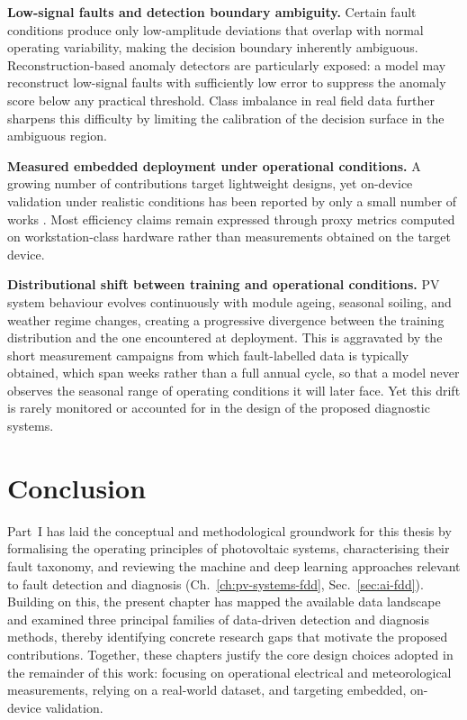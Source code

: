 \textbf{Low-signal faults and detection boundary ambiguity.} Certain fault conditions produce only low-amplitude deviations that overlap with normal operating variability, making the decision boundary inherently ambiguous. Reconstruction-based anomaly detectors are particularly exposed: a model may reconstruct low-signal faults with sufficiently low error to suppress the anomaly score below any practical threshold. Class imbalance in real field data further sharpens this difficulty by limiting the calibration of the decision surface in the ambiguous region.

\textbf{Measured embedded deployment under operational conditions.} A growing number of contributions target lightweight designs, yet on-device validation under realistic conditions has been reported by only a small number of works \citep{costa2020sensors}. Most efficiency claims remain expressed through proxy metrics computed on workstation-class hardware rather than measurements obtained on the target device.

\textbf{Distributional shift between training and operational conditions.} PV system behaviour evolves continuously with module ageing, seasonal soiling, and weather regime changes, creating a progressive divergence between the training distribution and the one encountered at deployment. This is aggravated by the short measurement campaigns from which fault-labelled data is typically obtained, which span weeks rather than a full annual cycle, so that a model never observes the seasonal range of operating conditions it will later face. Yet this drift is rarely monitored or accounted for in the design of the proposed diagnostic systems.

\section*{Conclusion}

Part~I has laid the conceptual and methodological groundwork for this thesis by formalising the operating principles of photovoltaic systems, characterising their fault taxonomy, and reviewing the machine and deep learning approaches relevant to fault detection and diagnosis (Ch.~\ref{ch:pv-systems-fdd}, Sec.~\ref{sec:ai-fdd}). Building on this, the present chapter has mapped the available data landscape and examined three principal families of data-driven detection and diagnosis methods, thereby identifying concrete research gaps that motivate the proposed contributions. Together, these chapters justify the core design choices adopted in the remainder of this work: focusing on operational electrical and meteorological measurements, relying on a real-world dataset, and targeting embedded, on-device validation.